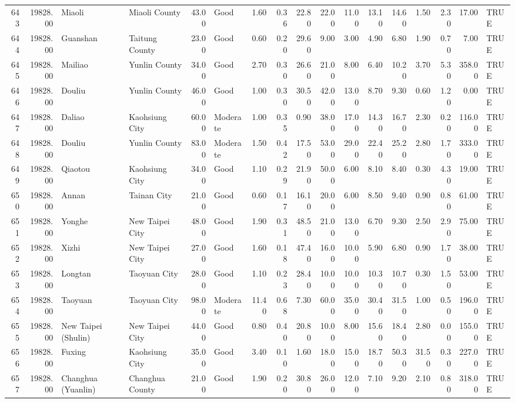 \begin{table}[ht]
\begin{tabular}{rrllrlrrrrrrrrrrl}
  643 & 19828.00 & Miaoli & Miaoli County & 43.00 & Good & 1.60 & 0.36 & 22.80 & 22.00 & 11.00 & 13.10 & 14.60 & 1.50 & 2.30 & 17.00 & TRUE \\ 
  644 & 19828.00 & Guanshan & Taitung County & 23.00 & Good & 0.60 & 0.20 & 29.60 & 9.00 & 3.00 & 4.90 & 6.80 & 1.90 & 0.70 & 7.00 & TRUE \\ 
  645 & 19828.00 & Mailiao & Yunlin County & 34.00 & Good & 2.70 & 0.30 & 26.60 & 21.00 & 8.00 & 6.40 & 10.20 & 3.70 & 5.30 & 358.00 & TRUE \\ 
  646 & 19828.00 & Douliu & Yunlin County & 46.00 & Good & 1.00 & 0.30 & 30.50 & 42.00 & 13.00 & 8.70 & 9.30 & 0.60 & 1.20 & 0.00 & TRUE \\ 
  647 & 19828.00 & Daliao & Kaohsiung City & 60.00 & Moderate & 1.00 & 0.35 & 0.90 & 38.00 & 17.00 & 14.30 & 16.70 & 2.30 & 0.20 & 116.00 & TRUE \\ 
  648 & 19828.00 & Douliu & Yunlin County & 83.00 & Moderate & 1.50 & 0.42 & 17.50 & 53.00 & 29.00 & 22.40 & 25.20 & 2.80 & 1.70 & 333.00 & TRUE \\ 
  649 & 19828.00 & Qiaotou & Kaohsiung City & 34.00 & Good & 1.10 & 0.29 & 21.90 & 50.00 & 6.00 & 8.10 & 8.40 & 0.30 & 4.30 & 19.00 & TRUE \\ 
  650 & 19828.00 & Annan & Tainan City & 21.00 & Good & 0.60 & 0.17 & 16.10 & 20.00 & 6.00 & 8.50 & 9.40 & 0.90 & 0.80 & 61.00 & TRUE \\ 
  651 & 19828.00 & Yonghe & New Taipei City & 48.00 & Good & 1.90 & 0.31 & 48.50 & 21.00 & 13.00 & 6.70 & 9.30 & 2.50 & 2.90 & 75.00 & TRUE \\ 
  652 & 19828.00 & Xizhi & New Taipei City & 27.00 & Good & 1.60 & 0.18 & 47.40 & 16.00 & 10.00 & 5.90 & 6.80 & 0.90 & 1.70 & 38.00 & TRUE \\ 
  653 & 19828.00 & Longtan & Taoyuan City & 28.00 & Good & 1.10 & 0.23 & 28.40 & 10.00 & 10.00 & 10.30 & 10.70 & 0.30 & 1.50 & 53.00 & TRUE \\ 
  654 & 19828.00 & Taoyuan & Taoyuan City & 98.00 & Moderate & 11.40 & 0.68 & 7.30 & 60.00 & 35.00 & 30.40 & 31.50 & 1.00 & 0.50 & 196.00 & TRUE \\ 
  655 & 19828.00 & New Taipei (Shulin) & New Taipei City & 44.00 & Good & 0.80 & 0.40 & 20.80 & 10.00 & 8.00 & 15.60 & 18.40 & 2.80 & 0.00 & 155.00 & TRUE \\ 
  656 & 19828.00 & Fuxing & Kaohsiung City & 35.00 & Good & 3.40 & 0.10 & 1.60 & 18.00 & 15.00 & 18.70 & 50.30 & 31.50 & 0.30 & 227.00 & TRUE \\ 
  657 & 19828.00 & Changhua (Yuanlin) & Changhua County & 21.00 & Good & 1.90 & 0.20 & 30.80 & 26.00 & 12.00 & 7.10 & 9.20 & 2.10 & 0.80 & 318.00 & TRUE \\ 

\end{tabular}
\end{table}
